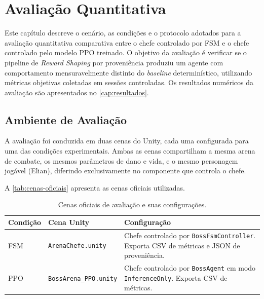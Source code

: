 \chapter{Avaliação Quantitativa}
\label{cap:avaliacao}

Este capítulo descreve o cenário, as condições e o protocolo adotados para a
avaliação quantitativa comparativa entre o chefe controlado por FSM e o chefe
controlado pelo modelo PPO treinado. O objetivo da avaliação é verificar se o
pipeline de \textit{Reward Shaping} por proveniência produziu um agente com
comportamento mensuravelmente distinto do \textit{baseline} determinístico,
utilizando métricas objetivas coletadas em sessões controladas. Os resultados
numéricos da avaliação são apresentados no \autoref{cap:resultados}.

\section{Ambiente de Avaliação}
\label{sec:ambiente-avaliacao}

A avaliação foi conduzida em duas cenas do Unity, cada uma configurada para
uma das condições experimentais. Ambas as cenas compartilham a mesma arena de
combate, os mesmos parâmetros de dano e vida, e o mesmo personagem jogável
(Elian), diferindo exclusivamente no componente que controla o chefe.

A \autoref{tab:cenas-oficiais} apresenta as cenas oficiais utilizadas.

\begin{table}[htb]
    \centering
    \caption{Cenas oficiais de avaliação e suas configurações.}
    \label{tab:cenas-oficiais}
    \begin{tabular}{l p{5cm} p{5.5cm}}
        \toprule
        \textbf{Condição} & \textbf{Cena Unity}
                          & \textbf{Configuração} \\
        \midrule
        FSM & \texttt{ArenaChefe.unity}
            & Chefe controlado por \texttt{BossFsmController}. Exporta CSV
              de métricas e JSON de proveniência. \\
        \addlinespace
        PPO & \texttt{BossArena\_PPO.unity}
            & Chefe controlado por \texttt{BossAgent} em modo
              \texttt{InferenceOnly}. Exporta CSV de métricas. \\
        \bottomrule
    \end{tabular}
\end{table}

